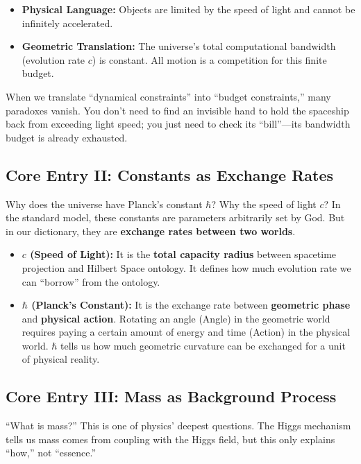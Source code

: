 \begin{itemize}
\item \textbf{Physical Language:} Objects are limited by the speed of light and cannot be infinitely accelerated.

\item \textbf{Geometric Translation:} The universe's total computational bandwidth (evolution rate $c$) is constant. All motion is a competition for this finite budget.
\end{itemize}

When we translate ``dynamical constraints'' into ``budget constraints,'' many paradoxes vanish. You don't need to find an invisible hand to hold the spaceship back from exceeding light speed; you just need to check its ``bill''---its bandwidth budget is already exhausted.

\subsection{Core Entry II: Constants as Exchange Rates}

Why does the universe have Planck's constant $\hbar$? Why the speed of light $c$? In the standard model, these constants are parameters arbitrarily set by God. But in our dictionary, they are \textbf{exchange rates between two worlds}.

\begin{itemize}
\item \textbf{$c$ (Speed of Light):} It is the \textbf{total capacity radius} between spacetime projection and Hilbert Space ontology. It defines how much evolution rate we can ``borrow'' from the ontology.

\item \textbf{$\hbar$ (Planck's Constant):} It is the exchange rate between \textbf{geometric phase} and \textbf{physical action}. Rotating an angle (Angle) in the geometric world requires paying a certain amount of energy and time (Action) in the physical world. $\hbar$ tells us how much geometric curvature can be exchanged for a unit of physical reality.
\end{itemize}

\subsection{Core Entry III: Mass as Background Process}

``What is mass?'' This is one of physics' deepest questions. The Higgs mechanism tells us mass comes from coupling with the Higgs field, but this only explains ``how,'' not ``essence.''

